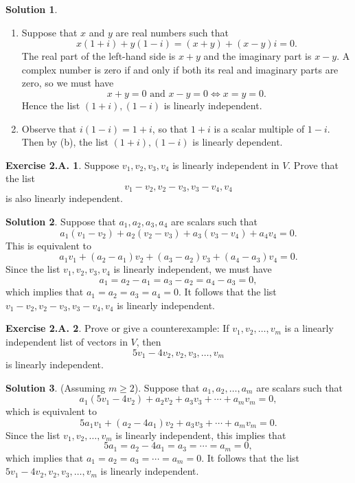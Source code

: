 \documentclass[12pt]{article}
\theoremstyle{definition}
\theoremstyle{exercise}
\newtheorem{exercise}{Exercise 2.A.}
\theoremstyle{solution}
\newtheorem*{solution}{Solution}
\begin{document}
\begin{solution}
    \begin{enumerate}
        \item Suppose that \( x \) and \( y \) are real numbers such that
        \[
            x(1 + i) + y(1 - i) = (x + y) + (x - y)i = 0.
        \]
        The real part of the left-hand side is \( x + y \) and the imaginary part is \( x - y \). A complex number is zero if and only if both its real and imaginary parts are zero, so we must have
        \[
            x + y = 0 \text{ and } x - y = 0 \iff x = y = 0.
        \]
        Hence the list \( (1 + i), (1 - i) \) is linearly independent.

        \item Observe that \( i(1 - i) = 1 + i \), so that \( 1 + i \) is a scalar multiple of \( 1 - i \). Then by  (b), the list \( (1 + i), (1 - i) \) is linearly dependent.
    \end{enumerate}
\end{solution}

\begin{exercise}
\label{ex:6}
    Suppose \( v_1, v_2, v_3, v_4 \) is linearly independent in \( V \). Prove that the list
    \[
        v_1 - v_2, v_2 - v_3, v_3 - v_4, v_4
    \]
    is also linearly independent.
\end{exercise}

\begin{solution}
    Suppose that \( a_1, a_2, a_3, a_4 \) are scalars such that
    \[
        a_1 (v_1 - v_2) + a_2 (v_2 - v_3) + a_3 (v_3 - v_4) + a_4 v_4 = 0.
    \]
    This is equivalent to
    \[
        a_1 v_1 + (a_2 - a_1) v_2 + (a_3 - a_2) v_3 + (a_4 - a_3) v_4 = 0.
    \]
    Since the list \( v_1, v_2, v_3, v_4 \) is linearly independent, we must have
    \[
        a_1 = a_2 - a_1 = a_3 - a_2 = a_4 - a_3 = 0,
    \]
    which implies that \( a_1 = a_2 = a_3 = a_4 = 0 \). It follows that the list \( v_1 - v_2, v_2 - v_3, v_3 - v_4, v_4 \) is linearly independent.
\end{solution}

\begin{exercise}
\label{ex:7}
    Prove or give a counterexample: If \( v_1, v_2, \ldots, v_m \) is a linearly independent list of vectors in \( V \), then
    \[
        5 v_1 - 4 v_2, v_2, v_3, \ldots, v_m
    \]
    is linearly independent.
\end{exercise}

\begin{solution}
    (Assuming \( m \geq 2 \)). Suppose that \( a_1, a_2, \ldots, a_m \) are scalars such that
    \[
        a_1 (5 v_1 - 4 v_2) + a_2 v_2 + a_3 v_3 + \cdots + a_m v_m = 0,
    \]
    which is equivalent to
    \[
        5 a_1 v_1 + (a_2 - 4 a_1) v_2 + a_3 v_3 + \cdots + a_m v_m = 0.
    \]
    Since the list \( v_1, v_2, \ldots, v_m \) is linearly independent, this implies that
    \[
        5 a_1 = a_2 - 4 a_1 = a_3 = \cdots = a_m = 0,
    \]
    which implies that \( a_1 = a_2 = a_3 = \cdots = a_m = 0 \). It follows that the list \( 5 v_1 - 4 v_2, v_2, v_3, \ldots, v_m \) is linearly independent.
\end{solution}
\end{document}
